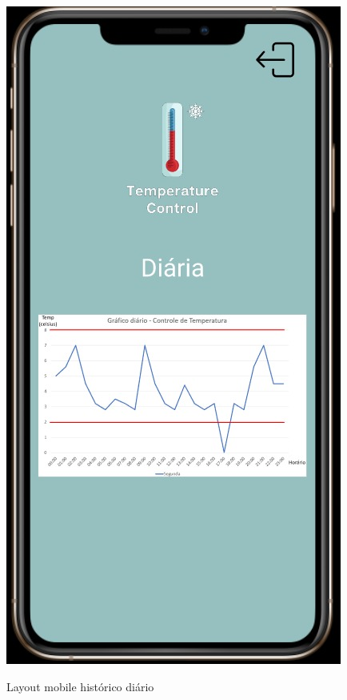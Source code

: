 \documentclass[hidelinks, 12pt, a4paper, brazil, oneside]{abntex2}
\begin{document}
    \begin{figure}[ht]
        \caption{Layout mobile histórico diário}
        \centering
        \includegraphics[scale=0.5]{img/mobile/temp_diaria.jpeg}
        \label{fig:mobileTempDiaria}
    \end{figure}
\end{document}
